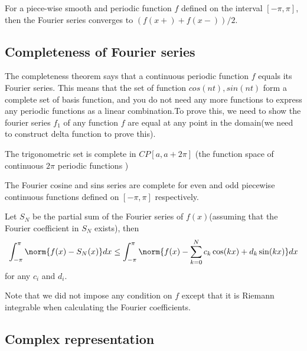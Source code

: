 \begin{refsection}
For a piece-wise smooth and periodic function $f$ defined on the interval $[-\pi, \pi]$, then the Fourier series converges to $(f(x+)+f(x-))/2$.

\subsection{Completeness of Fourier series}
\begin{remark}[completeness]
	The completeness theorem says that a continuous periodic function $f$ equals its Fourier series. This means that the set of function $cos(nt),sin(nt)$ form a complete set of basis function, and you do not need any more functions to express any periodic functions as a linear combination.To prove this, we need to show the fourier series $f_1$ of any function $f$ are equal at any point in the domain(we need to construct delta function to prove this).
\end{remark}



\begin{corollary}
	The trigonometric set is complete in $CP[a,a+2\pi]$ (the function space of continuous $2\pi$ periodic functions )\cite{johnsonbaugh2010foundations}
\end{corollary}

\begin{corollary}
	The Fourier cosine and sins series are complete for even and odd piecewise continuous functions defined on $[-\pi,\pi]$ respectively.
\end{corollary}

\begin{lemma}
	\cite[78]{stein2011fourier} Let $S_N$ be the partial sum of the Fourier series of $f(x)$(assuming that the Fourier coefficient in $S_N$ exists), then
	$$\int_{-\pi}^\pi \norm{f(x) - S_N(x)}dx \leq \int_{-\pi}^\pi \norm{f(x) - \sum_{k=0}^N c_k \cos(kx) + d_k \sin(kx)}dx$$
	for any $c_i$ and $d_i$.
\end{lemma}

\begin{remark}
	Note that we did not impose any condition on $f$ except that it is Riemann integrable when calculating the Fourier coefficients.  
\end{remark}

\subsection{Complex representation}


\end{refsection}
